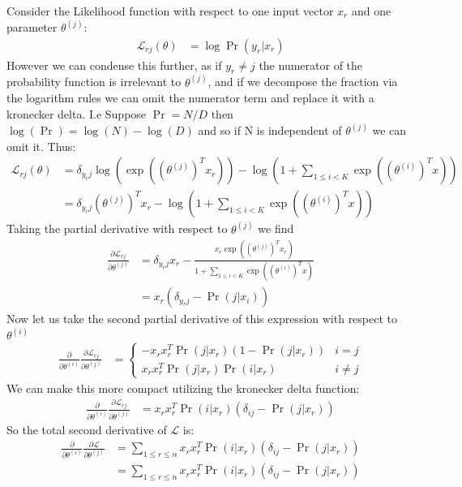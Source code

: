 \documentclass[12pt]{article}
\begin{document}
Consider the Likelihood function with respect to one input vector $x_r$
and one parameter $\theta^{(j)}$:
\begin{align*}
    \mathcal{L}_{rj}(\theta) &= \log\Pr(y_r | x_r)  
\end{align*}
However we can condense this further, as if $y_r \neq j$ the numerator of the probability
function is irrelevant to $\theta^{(j)}$, and if we decompose the fraction via the logarithm rules
we can omit the numerator term and replace it with a kronecker delta. I.e Suppose $\Pr = N/D$
then $\log(\Pr) = \log(N) - \log(D)$  and so if N is independent of $\theta^(j)$ we can omit it.
Thus:
\begin{align*}
     \mathcal{L}_{rj}(\theta) &= \delta_{{y_r}j}\log(\exp((\theta^{(j)})^Tx_r)) - \log(1 + \displaystyle \sum_{1 \leq i < K}\exp((\theta^{(i)})^Tx)) \\
     &= \delta_{{y_r}j}(\theta^{(j)})^Tx_r - \log(1 + \displaystyle \sum_{1 \leq i < K}\exp((\theta^{(i)})^Tx))
\end{align*}
Taking the partial derivative with respect to $\theta^{(j)}$ we find
\begin{align*}
    \frac{\partial \mathcal{L}_{rj}}{\partial \theta^{(j)}} &= \delta_{y_r j}x_r - \frac{x_r\exp((\theta^{(j)})^Tx_r)}{1 + \displaystyle \sum_{1 \leq i < K}\exp((\theta^{(i)})^Tx)} \\
    &= x_r(\delta_{y_rj} - \Pr(j|x_i))
\end{align*}
Now let us take the second partial derivative of this expression with respect to $\theta^{(i)}$
\begin{align*}
    \frac{\partial}{\partial \theta^{(i)}}\frac{\partial \mathcal{L}_{rj}}{\partial \theta^{(j)}} &= \begin{cases}
        -x_rx_r^T\Pr(j|x_r)(1 - \Pr(j|x_r)) & i = j \\
        x_rx_r^T\Pr(j|x_r)\Pr(i|x_r) & i \neq j
    \end{cases}
\end{align*}
We can make this more compact utilizing the kronecker delta function:
\begin{align*}
    \frac{\partial}{\partial \theta^{(i)}}\frac{\partial \mathcal{L}_{rj}}{\partial \theta^{(j)}} &=
    x_rx_r^T\Pr(i|x_r)(\delta_{ij} - \Pr(j|x_r))
\end{align*}
So the total second derivative of $\mathcal{L}$ is:
\begin{align*}
    \frac{\partial}{\partial \theta^{(i)}}\frac{\partial \mathcal{L}}{\partial \theta^{(j)}} &=
    \displaystyle \sum_{1 \leq r \leq n}x_rx_r^T\Pr(i|x_r)(\delta_{ij} - \Pr(j|x_r)) \\
    &= \displaystyle \sum_{1 \leq r \leq n}x_rx_r^T\Pr(i|x_r)(\delta_{ij} - \Pr(j|x_r))
\end{align*}
\end{document}
